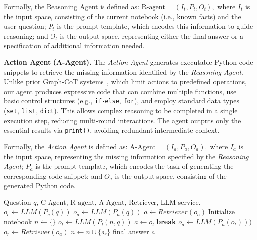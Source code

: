 Formally, the Reasoning Agent is defined as:
$
\text{R-agent} = (I_t, P_t, O_t),
$
where $I_t$ is the input space, consisting of the current notebook (i.e., known facts) and the user question; \( P_t \) is the prompt template, which encodes this information to guide reasoning; and \( O_t \) is the output space, representing either the final answer or a specification of additional information needed.
\fi




\textbf{Action Agent (A-Agent).}
The \textit{Action Agent} generates executable Python code snippets to retrieve the missing information identified by the \textit{Reasoning Agent}. Unlike prior Graph-CoT systems~\cite{jin2024graph}, which limit actions to predefined operations, our agent produces expressive code that can combine multiple functions, use basic control structures (e.g., \texttt{if-else}, \texttt{for}), and employ standard data types (\texttt{set}, \texttt{list}, \texttt{dict}). This allows complex reasoning to be completed in a single execution step, reducing multi-round interactions. The agent outputs only the essential results via \texttt{print()}, avoiding redundant intermediate context.


Formally, the \textit{Action Agent} is defined as:
$
\text{A-Agent} = (I_a, P_a, O_a),
$
where $I_a$ is the input space, representing the missing information specified by the \textit{Reasoning Agent}; \( P_a \) is the prompt template, which encodes the task of generating the corresponding code snippet; and \( O_a \) is the output space, consisting of the generated Python code.

\begin{algorithm} [t]
\caption{Multi-Agent Reasoning Workflow.}
\label{alg:workflow}
\small
\begin{algorithmic}[1]
\Require Question $q$, $\text{C-Agent}$, $\text{R-agent}$, $\text{A-Agent}$, Retriever, LLM service.
\State $o_c \gets LLM(P_c(q))$
    \State $o_a \gets LLM(P_a(q))$
    \State $a \gets Retriever(o_a)$
\Else
    \State Initialize notebook $n \gets \{\}$
        \State $o_t \gets LLM(P_t(n, q))$
            \State $a \gets o_t$
            \State \textbf{break}
        \Else
            \State $o_a \gets LLM(P_a(o_t)))$
            \State $o_r \gets Retriever(o_a)$
            \State $n \gets n \cup \{o_r\}$
        \EndIf
    \EndWhile
\EndIf
\State \Return final answer $a$
\end{algorithmic}
\end{algorithm}

